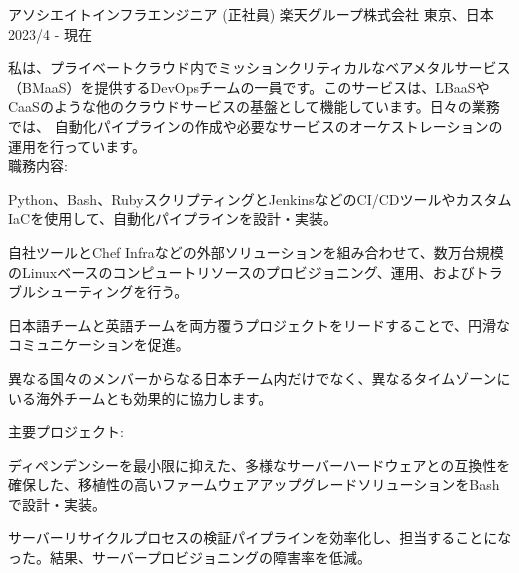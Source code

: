 

\begin{cventries}

  \cventry
    {アソシエイトインフラエンジニア (正社員)} %
    {楽天グループ株式会社} %
    {東京、日本} %
    {2023/4 - 現在} %
    {
      \begin{cvjobdesc} %
        私は、プライベートクラウド内でミッションクリティカルなベアメタルサービス（BMaaS）を提供するDevOpsチームの一員です。このサービスは、LBaaSやCaaSのような他のクラウドサービスの基盤として機能しています。日々の業務では、
        自動化パイプラインの作成や必要なサービスのオーケストレーションの運用を行っています。
        \vspace{2.0mm}
        \\職務内容:
        \begin{cvbullets}
        \item {Python、Bash、RubyスクリプティングとJenkinsなどのCI/CDツールやカスタムIaCを使用して、自動化パイプラインを設計・実装。}
        \item {自社ツールとChef Infraなどの外部ソリューションを組み合わせて、数万台規模のLinuxベースのコンピュートリソースのプロビジョニング、運用、およびトラブルシューティングを行う。}
        \item {日本語チームと英語チームを両方覆うプロジェクトをリードすることで、円滑なコミュニケーションを促進。}
        \item {異なる国々のメンバーからなる日本チーム内だけでなく、異なるタイムゾーンにいる海外チームとも効果的に協力します。}
        \end{cvbullets}
        \vspace{2.0mm}
        主要プロジェクト:
        \begin{cvbullets}
        \item {ディペンデンシーを最小限に抑えた、多様なサーバーハードウェアとの互換性を確保した、移植性の高いファームウェアアップグレードソリューションをBashで設計・実装。}
        \item {サーバーリサイクルプロセスの検証パイプラインを効率化し、担当することになった。結果、サーバープロビジョニングの障害率を低減。}
        \end{cvbullets}
      \end{cvjobdesc}
    }


\end{cventries}
